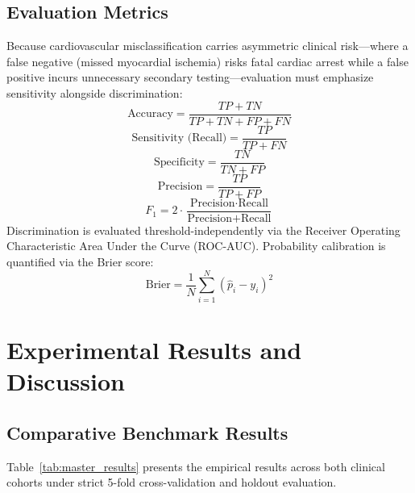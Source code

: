 \documentclass[conference]{IEEEtran}
\begin{document}
\subsection{Evaluation Metrics}
Because cardiovascular misclassification carries asymmetric clinical risk—where a false negative (missed myocardial ischemia) risks fatal cardiac arrest while a false positive incurs unnecessary secondary testing—evaluation must emphasize sensitivity alongside discrimination:
\begin{equation}
\text{Accuracy} = \frac{TP + TN}{TP + TN + FP + FN}
\end{equation}
\begin{equation}
\text{Sensitivity (Recall)} = \frac{TP}{TP + FN}
\end{equation}
\begin{equation}
\text{Specificity} = \frac{TN}{TN + FP}
\end{equation}
\begin{equation}
\text{Precision} = \frac{TP}{TP + FP}
\end{equation}
\begin{equation}
F_1 = 2 \cdot \frac{\text{Precision} \cdot \text{Recall}}{\text{Precision} + \text{Recall}}
\end{equation}
Discrimination is evaluated threshold-independently via the Receiver Operating Characteristic Area Under the Curve (ROC-AUC). Probability calibration is quantified via the Brier score:
\begin{equation}
\text{Brier} = \frac{1}{N} \sum_{i=1}^N (\hat{p}_i - y_i)^2
\end{equation}

\section{Experimental Results and Discussion}

\subsection{Comparative Benchmark Results}
Table~\ref{tab:master_results} presents the empirical results across both clinical cohorts under strict 5-fold cross-validation and holdout evaluation.
\end{document}

